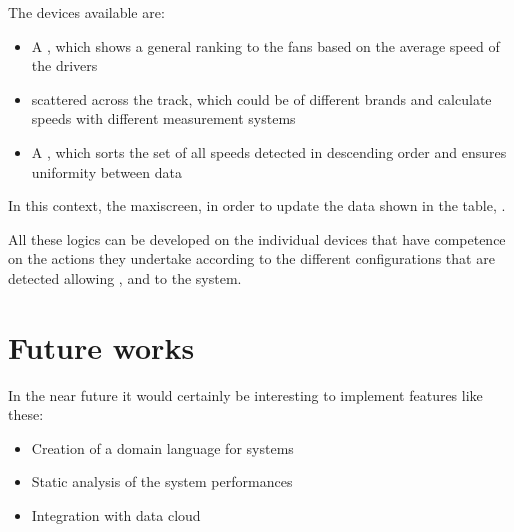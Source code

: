 \documentclass[a4paper,10pt,english,openany,oneside]{sphinxmanual}
\begin{document}
The devices available are:
\begin{itemize}
\item {} 
A , which shows a general ranking to the fans based on the average speed of the drivers

\item {} 
 scattered across the track, which could be of different brands and calculate speeds with different measurement systems 

\item {} 
A , which sorts the set of all speeds detected in descending order and ensures uniformity between data 

\end{itemize}

In this context, the maxi\sphinxhyphen{}screen, in order to update the
data shown in the table, .

All these logics can be developed on the individual devices that have
competence on the actions they undertake according to the different
configurations that are detected allowing , 
and  to the system.


\chapter{Future works}
\label{\detokenize{future:future-works}}\label{\detokenize{future::doc}}
In the near future it would certainly be interesting to implement
features like these:
\begin{itemize}
\item {} 
Creation of a domain language for  systems

\item {} 
Static analysis of the system performances

\item {} 
Integration with data cloud

\end{itemize}



\renewcommand{\indexname}{Index}
\printindex
\end{document}
